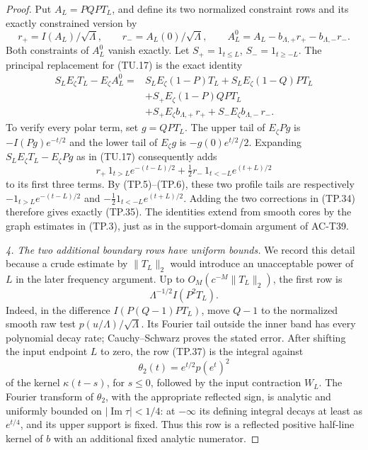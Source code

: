 \begin{proof}
Put \(A_L=PQPT_L\), and define its two normalized
constraint rows and its exactly constrained version by
\[
 r_+=I(A_L)/\sqrt{\Lambda},\qquad
 r_-=A_L(0)/\sqrt{\Lambda},\qquad
 A_L^0=A_L-b_{\Lambda,+}r_+-b_{\Lambda,-}r_- .
 \tag{TP.34}
\]
Both constraints of \(A_L^0\) vanish exactly.
Let \(S_+=1_{t\leq L}\), \(S_-=1_{t\geq-L}\).
The principal replacement for (TU.17) is the exact
identity
\[
 \begin{split}
 S_LE_\zeta T_L-E_\zeta A_L^0
 ={}&S_LE_\zeta(1-P)T_L
       +S_LE_\zeta(1-Q)PT_L\\
    &+S_+E_\zeta(1-P)QPT_L\\
    &+S_+E_\zeta b_{\Lambda,+}\,r_+
       +S_-E_\zeta b_{\Lambda,-}\,r_- .
 \end{split}
 \tag{TP.35}
\]
To verify every polar term, set \(g=QPT_L\).
The upper tail of \(E_\zeta Pg\) is
\(-I(Pg)e^{-t/2}\) and the lower tail of
\(E_\zeta g\) is \(-g(0)e^{t/2}/2\).
Expanding \(S_LE_\zeta T_L-E_\zeta Pg\)
as in (TU.17) consequently adds
\[
 r_+\,1_{t>L}e^{-(t-L)/2}
       +\tfrac12 r_-\,1_{t<-L}e^{(t+L)/2}
 \tag{TP.36}
\]
to its first three terms.
By (TP.5)--(TP.6), these two profile tails are
respectively
\(-1_{t>L}e^{-(t-L)/2}\) and
\(-\tfrac12 1_{t<-L}e^{(t+L)/2}\).
Adding the two corrections in (TP.34) therefore
gives exactly (TP.35).
The identities extend from smooth cores by the
graph estimates in (TP.3), just as in the
support-domain argument of AC-T39.

\emph{4. The two additional boundary rows have uniform bounds.}
We record this detail because a crude estimate by
\(\|T_L\|_2\) would introduce an unacceptable
power of \(L\) in the later frequency argument.
Up to \(O_M(c^{-M}\|T_L\|_2)\), the first row is
\[
             \Lambda^{-1/2}I(P^2T_L).
 \tag{TP.37}
\]
Indeed, in the difference
\(I(P(Q-1)PT_L)\), move \(Q-1\) to the normalized
smooth raw test \(p(u/\Lambda)/\sqrt{\Lambda}\).
Its Fourier tail outside the inner band has
every polynomial decay rate; Cauchy--Schwarz
proves the stated error.
After shifting the input endpoint \(L\) to zero,
the row (TP.37) is the integral against
\[
 \theta_2(t)=e^{t/2}p(e^t)^2
\]
of the kernel \(\kappa(t-s)\), for \(s\leq0\),
followed by the input contraction \(W_L\).
The Fourier transform of \(\theta_2\), with the
appropriate reflected sign, is analytic and
uniformly bounded on \(|\operatorname{Im}\tau|<1/4\):
at \(-\infty\) its defining integral decays at
least as \(e^{t/4}\), and its upper support is
fixed.  Thus this row is a reflected positive
half-line kernel of \(b\) with an additional
fixed analytic numerator.


\end{proof}
